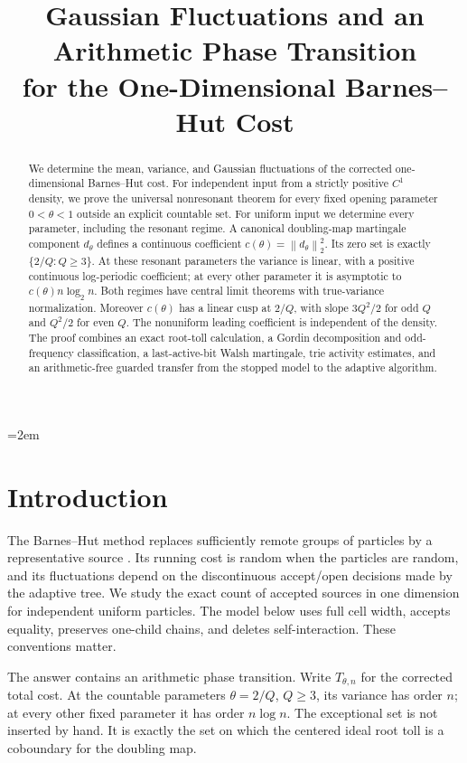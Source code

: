 \documentclass[11pt]{article}
\numberwithin{equation}{section}
\theoremstyle{definition}\newtheorem{definition}[theorem]{Definition}
\theoremstyle{remark}\newtheorem{remark}[theorem]{Remark}
\newcommand{\1}{\mathbf 1}\newcommand{\cD}{\mathcal D}
\newcommand{\norm}[1]{\left\lVert#1\right\rVert}
\begin{document}
\linespread{1.60}\selectfont\emergencystretch=2em
\title{Gaussian Fluctuations and an Arithmetic Phase Transition\\for the One-Dimensional Barnes--Hut Cost}
\author{}\date{}\maketitle
\begin{abstract}
We determine the mean, variance, and Gaussian fluctuations of the corrected
one-dimensional Barnes--Hut cost.  For independent input from a strictly
positive $C^1$ density, we prove the universal nonresonant theorem for every
fixed opening parameter $0<\theta<1$ outside an explicit countable set.
For uniform input we determine every parameter, including the resonant regime.  A canonical doubling-map martingale component $d_\theta$
defines a continuous coefficient $c(\theta)=\norm{d_\theta}_2^2$.  Its zero
set is exactly $\{2/Q:Q\ge3\}$.  At these resonant parameters the variance
is linear, with a positive continuous log-periodic coefficient; at every
other parameter it is asymptotic to $c(\theta)n\log_2n$.  Both regimes have
central limit theorems with true-variance normalization.  Moreover
$c(\theta)$ has a linear cusp at $2/Q$, with slope $3Q^2/2$ for odd $Q$ and
$Q^2/2$ for even $Q$.  The nonuniform leading coefficient is independent of the density.  The proof combines an exact root-toll calculation,
a Gordin decomposition and odd-frequency classification, a last-active-bit
Walsh martingale, trie activity estimates, and an arithmetic-free guarded
transfer from the stopped model to the adaptive algorithm.
\end{abstract}

\section{Introduction}
The Barnes--Hut method replaces sufficiently remote groups of particles by
a representative source \cite{BH}.  Its running cost is random when the
particles are random, and its fluctuations depend on the discontinuous
accept/open decisions made by the adaptive tree.  We study the exact count
of accepted sources in one dimension for independent uniform particles.
The model below uses full cell width, accepts equality, preserves one-child
chains, and deletes self-interaction.  These conventions matter.

The answer contains an arithmetic phase transition.  Write $T_{\theta,n}$
for the corrected total cost.  At the countable parameters $\theta=2/Q$,
$Q\ge3$, its variance has order $n$; at every other fixed parameter it has
order $n\log n$.  The exceptional set is not inserted by hand.  It is
exactly the set on which the centered ideal root toll is a coboundary for
the doubling map.
\end{document}

